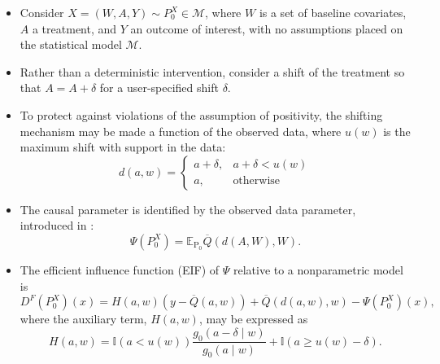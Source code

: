 \documentclass[landscape,a0paper,fontscale=0.285]{baposter} %
\begin{document}
\begin{poster}
{\begin{itemize}
  \itemsep0.75pt
  \item Consider $X = (W, A, Y) \sim P_0^X \in \mathcal{M}$, where $W$ is a set
    of baseline covariates, $A$ a treatment, and $Y$ an outcome of interest,
    with no assumptions placed on the statistical model $\mathcal{M}$.
  \item Rather than a deterministic intervention, consider a shift of the
    treatment so that $A = A + \delta$ for a user-specified shift $\delta$.
  \item To protect against violations of the assumption of positivity, the
    shifting mechanism may be made a function of the observed data, where
    $u(w)$ is the maximum shift with support in the data:
    \[ d(a, w) =
       \begin{cases}
         a + \delta, & a + \delta < u(w) \\
         a, & \text{otherwise}
       \end{cases}
    \]
  \item The causal parameter is identified by the observed data parameter,
    introduced in \cite{munoz2012population}:
    \begin{equation}
      \Psi(P_0^X) = \mathbb{E}_{\text{P}_0}{\overline{Q}(d(A, W), W)}.
    \end{equation}
  \item The efficient influence function (EIF) of $\Psi$ relative to a
    nonparametric model is
        \begin{equation}
          D^F(P_0^X)(x) = H(a, w)({y - \overline{Q}(a, w)}) +
            \overline{Q}(d(a, w), w) - \Psi(P_0^X)(x),
        \end{equation}
      where the auxiliary term, $H(a,w)$, may be expressed as
        \begin{equation}
          H(a,w) = \mathbb{I}(a < u(w)) \frac{g_0(a - \delta \mid w)}{g_0(a
            \mid w)} + \mathbb{I}(a \geq u(w) - \delta).
        \end{equation}
\end{itemize}
}


\end{poster}
\end{document}
